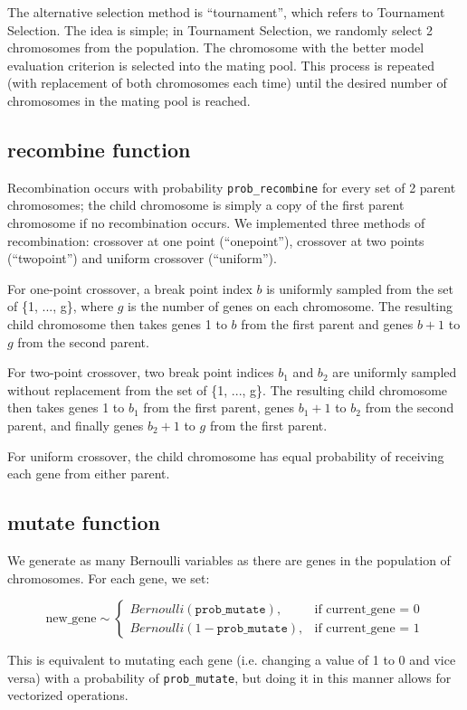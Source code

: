 \documentclass[11pt]{article}
\begin{document}
The alternative selection method is ``tournament'', which refers to Tournament Selection. The idea is simple; in Tournament Selection, we randomly select 2 chromosomes from the population. The chromosome with the better model evaluation criterion is selected into the mating pool. This process is repeated (with replacement of both chromosomes each time) until the desired number of chromosomes in the mating pool is reached.

\subsection*{recombine function}
Recombination occurs with probability \texttt{prob\_recombine} for every set of 2 parent chromosomes; the child chromosome is simply a copy of the first parent chromosome if no recombination occurs. We implemented three methods of recombination: crossover at one point (``onepoint''), crossover at two points (``twopoint'') and uniform crossover (``uniform'').

For one-point crossover, a break point index $b$ is uniformly sampled from the set of \{1, ..., g\}, where $g$ is the number of genes on each chromosome. The resulting child chromosome then takes genes 1 to $b$ from the first parent and genes $b+1$ to $g$ from the second parent.

For two-point crossover, two break point indices $b_1$ and $b_2$ are uniformly sampled without replacement from the set of \{1, ..., g\}. The resulting child chromosome then takes genes 1 to $b_1$ from the first parent, genes $b_1+1$ to $b_2$ from the second parent, and finally genes $b_2+1$ to $g$ from the first parent.

For uniform crossover, the child chromosome has equal probability of receiving each gene from either parent.

\subsection*{mutate function}
We generate as many Bernoulli variables as there are genes in the population of chromosomes. For each gene, we set:

\[
\text{new\_gene} \sim
\begin{cases}
Bernoulli(\texttt{prob\_mutate}), & \text{if current\_gene = 0}\\
Bernoulli(1-\texttt{prob\_mutate}), & \text{if current\_gene = 1}
\end{cases}
\]

This is equivalent to mutating each gene (i.e. changing a value of 1 to 0 and vice versa) with a probability of \texttt{prob\_mutate}, but doing it in this manner allows for vectorized operations.
\end{document}
